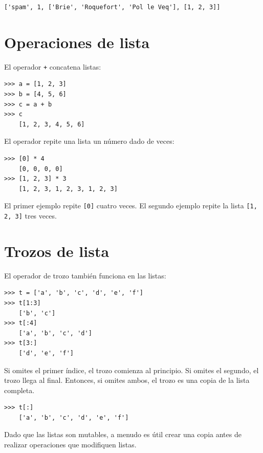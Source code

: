 \documentclass[10pt]{book}
\begin{document}
\begin{verbatim}
['spam', 1, ['Brie', 'Roquefort', 'Pol le Veq'], [1, 2, 3]]
\end{verbatim}



\section{Operaciones de lista}

El operador {\tt +} concatena listas:

\begin{verbatim}
>>> a = [1, 2, 3]
>>> b = [4, 5, 6]
>>> c = a + b
>>> c
    [1, 2, 3, 4, 5, 6]
\end{verbatim}
%
El operador {\tt *} repite una lista un número dado de veces:

\begin{verbatim}
>>> [0] * 4
    [0, 0, 0, 0]
>>> [1, 2, 3] * 3
    [1, 2, 3, 1, 2, 3, 1, 2, 3]
\end{verbatim}
%
El primer ejemplo repite {\tt [0]} cuatro veces.  El segundo ejemplo
repite la lista {\tt [1, 2, 3]} tres veces.


\section{Trozos de lista}

El operador de trozo también funciona en las listas:

\begin{verbatim}
>>> t = ['a', 'b', 'c', 'd', 'e', 'f']
>>> t[1:3]
    ['b', 'c']
>>> t[:4]
    ['a', 'b', 'c', 'd']
>>> t[3:]
    ['d', 'e', 'f']
\end{verbatim}
%
Si omites el primer índice, el trozo comienza al principio.
Si omites el segundo, el trozo llega al final.  Entonces, si
omites ambos, el trozo es una copia de la lista completa.

\begin{verbatim}
>>> t[:]
    ['a', 'b', 'c', 'd', 'e', 'f']
\end{verbatim}
%
Dado que las listas son mutables, a menudo es útil crear una copia
antes de realizar operaciones que modifiquen listas.
\end{document}

